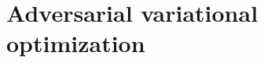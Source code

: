 \documentclass[twocolumn,superscriptaddress,aps]{revtex4-1}
\newcommand{\bftheta}{{\bm \theta}}
\newcommand{\bfpsi}{{\bm \psi}}
\newcommand{\bfphi}{{\bm \phi}}
\theoremstyle{plain}
\begin{document}




\section{Adversarial variational optimization}
\end{document}

